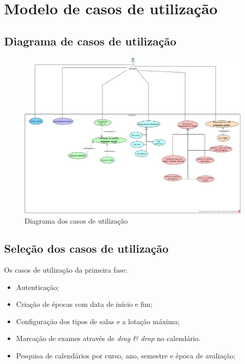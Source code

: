 \documentclass[11pt, twoside]{report}
\begin{document}
	
	\chapter{Modelo de casos de utilização}
	\section{Diagrama de casos de utilização}
	
\clearpage
\begin{landscape}
	\pagestyle{empty}
	
		\begin{figure}[H] 
			\centering 			\includegraphics[width=1.3\textwidth,height=1.3\textheight,keepaspectratio]{image/diagrama}
			\caption{Diagrama dos casos de utilização}
		
		\end{figure}
\end{landscape}


	\section{Seleção dos casos de utilização}
	\label{selecaocasosdeuso}
	Os casos de utilização da primeira fase:
	
	\begin{itemize}
		\item Autenticação;
	 	\item Criação de épocas com data de início e fim;
	 	\item Configuração dos tipos de salas e a lotação máxima;
	 	\item Marcação de exames através de \textit{drag \& drop}  no calendário.
	 	\item Pesquisa de calendários por curso, ano, semestre e época de avaliação;
	\end{itemize}
	
\end{document}
